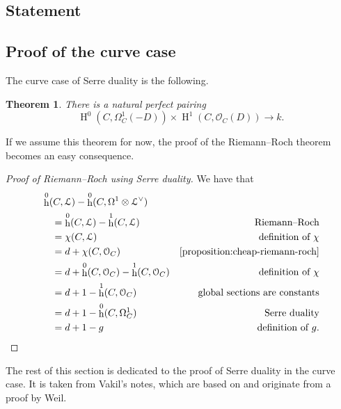 \documentclass[10pt,a4paper]{article}
\theoremstyle{lecture}
\newtheorem{theorem}{Theorem}
\DeclareMathOperator\hh{h}
\DeclareMathOperator\HH{H}
\begin{document}
\subsection{Statement}
\label{subsection:serre-duality-statement}

\subsection{Proof of the curve case}
\label{subsection:serre-duality-curves}
The curve case of Serre duality is the following.
\begin{theorem}
  \label{theorem:serre-duality-curves}
  There is a natural perfect pairing
  \begin{equation}
    \HH^0(C,\Omega_C^1(-D))\times\HH^1(C,\mathcal{O}_C(D))\to k.
  \end{equation}
\end{theorem}
If we assume this theorem for now, the proof of the Riemann--Roch theorem becomes an easy consequence.
\begin{proof}[Proof of Riemann--Roch using Serre duality]
  We have that
  \begin{equation}
    \begin{aligned}
      &\hh^0(C,\mathcal{L})-\hh^0(C,\Omega^1\otimes\mathcal{L}^\vee) \\
      &\quad=\hh^0(C,\mathcal{L})-\hh^1(C,\mathcal{L}) & \text{Riemann--Roch} \\
      &\quad=\chi(C,\mathcal{L}) & \text{definition of~$\chi$} \\
      &\quad=d+\chi(C,\mathcal{O}_C) & \text{\cref{proposition:cheap-riemann-roch}} \\
      &\quad=d+\hh^0(C,\mathcal{O}_C)-\hh^1(C,\mathcal{O}_C) & \text{definition of~$\chi$} \\
      &\quad=d+1-\hh^1(C,\mathcal{O}_C) & \text{global sections are constants} \\
      &\quad=d+1-\hh^0(C,\Omega_C^1) & \text{Serre duality} \\
      &\quad=d+1-g & \text{definition of $g$}.
    \end{aligned}
  \end{equation}
\end{proof}

The rest of this section is dedicated to the proof of Serre duality in the curve case. It is taken from Vakil's notes, which are based on \cite{serre-groupes-algebriques-et-corps-de-classes} and originate from a proof by Weil.
\end{document}
